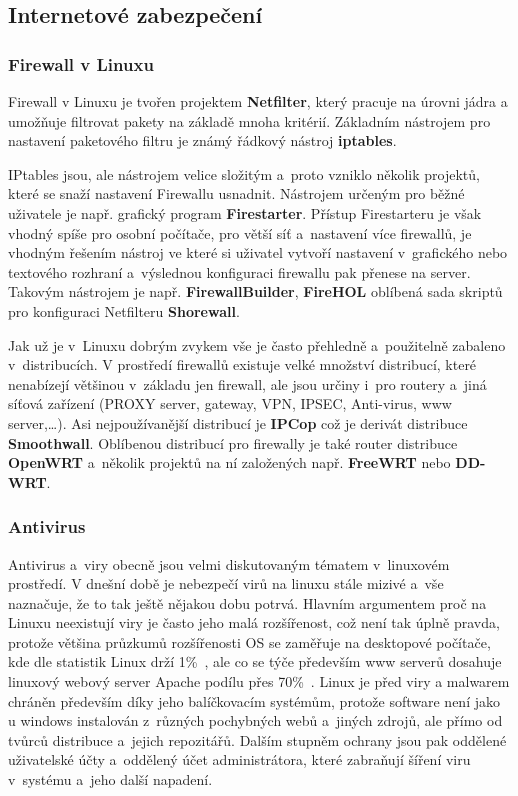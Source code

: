 \documentclass[a4paper,12pt]{article}
\renewcommand{\b}[1]{\textbf{#1}} %
\begin{document}
\subsection{Internetové zabezpečení}

\subsubsection{Firewall v Linuxu}
Firewall v Linuxu je tvořen projektem \b{Netfilter}, který pracuje na úrovni jádra a umožňuje filtrovat pakety na základě mnoha kritérií. Základním nástrojem pro nastavení paketového filtru je známý řádkový nástroj \b{iptables}.~\cite{FirewallNetfilter}

IPtables jsou, ale nástrojem velice složitým a~proto vzniklo několik projektů, které se snaží nastavení Firewallu usnadnit. Nástrojem určeným pro běžné uživatele je např. grafický program \b{Firestarter}. Přístup Firestarteru je však vhodný spíše pro osobní počítače, pro větší síť a~nastavení více firewallů, je vhodným řešením nástroj ve které si uživatel vytvoří nastavení v~grafického nebo textového rozhraní a~výslednou konfiguraci firewallu pak přenese na server. Takovým nástrojem je např. \b{FirewallBuilder}, \b{FireHOL} oblíbená sada skriptů pro konfiguraci Netfilteru \b{Shorewall}.

Jak už je v~Linuxu dobrým zvykem vše je často přehledně a~použitelně zabaleno v~distribucích. V prostředí firewallů existuje velké množství distribucí, které nenabízejí většinou v~základu jen firewall, ale jsou určiny i~pro routery a~jiná síťová zařízení (PROXY server, gateway, VPN, IPSEC, Anti-virus, www server,…). Asi nejpoužívanější distribucí je \b{IPCop} což je derivát distribuce \b{Smoothwall}. Oblíbenou distribucí pro firewally je také router distribuce \b{OpenWRT} a~několik projektů na ní založených např. \b{FreeWRT} nebo \b{DD-WRT}.

\subsubsection{Antivirus}\label{sec:antivirus}
Antivirus a~viry obecně jsou velmi diskutovaným tématem v~linuxovém prostředí. V dnešní době je nebezpečí virů na linuxu stále mizivé a~vše naznačuje, že to tak ještě nějakou dobu potrvá. Hlavním argumentem proč na Linuxu neexistují viry je často jeho malá rozšířenost, což není tak úplně pravda, protože většina průzkumů rozšířenosti OS se zaměřuje na desktopové počítače, kde dle statistik Linux drží 1\%~\cite{StatistikaOS}, ale co se týče především www serverů dosahuje linuxový webový server Apache podílu přes 70\%~\cite{StatLinuxWebServer}. Linux je před viry a malwarem chráněn především díky jeho balíčkovacím systémům, protože software není jako u windows instalován z~různých pochybných webů a~jiných zdrojů, ale přímo od tvůrců distribuce a~jejich repozitářů. Dalším stupněm ochrany jsou pak oddělené uživatelské účty a~oddělený účet administrátora, které zabraňují šíření viru v~systému a~jeho další napadení.~\cite{LinuxCZviry}
\end{document}
